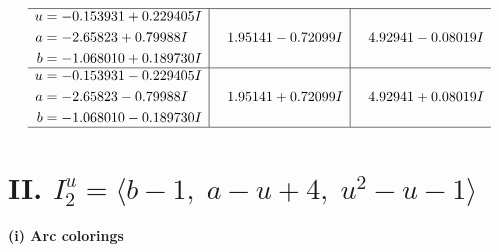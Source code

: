 \documentclass[1p]{elsarticle_modified}
\theoremstyle{definition}
\begin{document}
$$\begin{array}{c|c|c}
 \hline 
\begin{aligned}
u &= -0.153931 + 0.229405 I \\
a &= -2.65823 + 0.79988 I \\
b &= -1.068010 + 0.189730 I\end{aligned}
 & \phantom{-}1.95141 - 0.72099 I & \phantom{-}4.92941 - 0.08019 I \\ \hline\begin{aligned}
u &= -0.153931 - 0.229405 I \\
a &= -2.65823 - 0.79988 I \\
b &= -1.068010 - 0.189730 I\end{aligned}
 & \phantom{-}1.95141 + 0.72099 I & \phantom{-}4.92941 + 0.08019 I\\
 \hline 
 \end{array}$$\newpage\newpage\renewcommand{\arraystretch}{1}
\centering \section*{II. $I^u_{2}= \langle b-1,\;a- u+4,\;u^2- u-1 \rangle$}
\flushleft \textbf{(i) Arc colorings}\\
\end{document}
